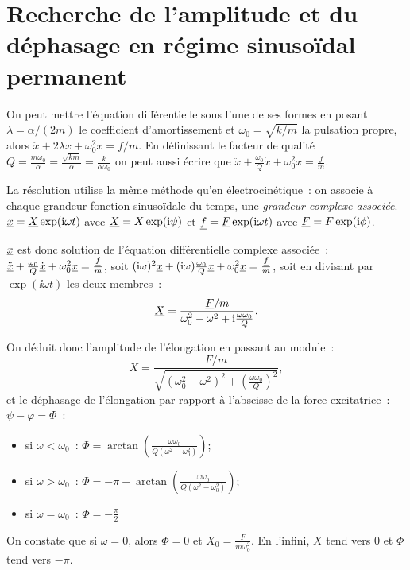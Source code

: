 \section{Recherche de l'amplitude et du déphasage en régime sinusoïdal 
permanent}
On peut mettre l'équation différentielle sous l'une de ses formes en posant 
\(\lambda = \alpha/(2m)\) le coefficient d'amortissement et 
\(\omega_0=\sqrt{k/m}\) la pulsation propre, alors \(\ddot{x}+2\lambda 
\dot{x}+\omega_0^2x = f/m\).
En définissant le facteur de qualité \(Q = 
\frac{m\omega_0}{\alpha}=\frac{\sqrt{km}}{\alpha}=\frac{k}{\alpha\omega_0}\) on 
peut aussi écrire que \(\ddot{x}+\frac{\omega_0}{Q}\dot{x}+\omega_0^2 
x=\frac{f}{m}\).

La résolution utilise la même méthode qu'en électrocinétique~: on associe à 
chaque grandeur fonction sinusoïdale du temps, une \emph{grandeur complexe 
associée}.
\(\underline{x} = \underline{X}\exp(\mathrm{i}\omega t)\) avec \(\underline{X} = X\exp(\mathrm{i}\psi)\) et \(\underline{f} = 
\underline{F}\exp(\mathrm{i}\omega t)\) avec \(\underline{F} = F\exp(\mathrm{i}\phi)\).

\(\underline{x}\) est donc solution de l'équation différentielle complexe associée~: 
\(\ddot{\underline{x}}+\frac{\omega_0}{Q}\dot{\underline{x}}+\omega_0^2 \underline{x}=\frac{\underline{f}}{m}\), soit 
\((\mathrm{i}\omega)^2\underline{x} + (\mathrm{i}\omega)\frac{\omega_0}{Q}\underline{x}+\omega_0^2\underline{x} = 
\frac{\underline{f}}{m}\), soit en divisant par \(\exp(\ii\omega t)\) les deux membres~:
\begin{equation}
  \label{eq:elongationcomplexe}
  \underline{X} = \frac{\underline{F}/m}{\omega_0^2-\omega^2+\mathrm{i}\frac{\omega\omega_0}{Q}}.
\end{equation}

On déduit donc l'amplitude de l'élongation en passant au module~:
\begin{equation}
  X = 
  \frac{F/m}{\sqrt{(\omega_0^2-\omega^2)^2+\left(\frac{\omega\omega_0}{Q}\right)^2}},
\end{equation}
et le déphasage de l'élongation par rapport à l'abscisse de la force 
excitatrice~: \(\psi-\varphi = \Phi\)~: \begin{itemize}
  \item si \(\omega<\omega_0\)~: \(\Phi = 
    \arctan(\frac{\omega\omega_0}{Q(\omega^2-\omega_0^2)})\);
  \item si \(\omega>\omega_0\)~: \(\Phi = -\pi + 
    \arctan(\frac{\omega\omega_0}{Q(\omega^2-\omega_0^2)})\);
  \item si \(\omega=\omega_0\)~: \(\Phi = -\frac{\pi}{2}\)
\end{itemize}
On constate que si \(\omega = 0\), alors \(\Phi=0\) et \(X_0 = 
\frac{F}{m\omega_0^2}\). En l'infini, \(X\) tend vers 0 et \(\Phi\) tend vers 
\(-\pi\).

